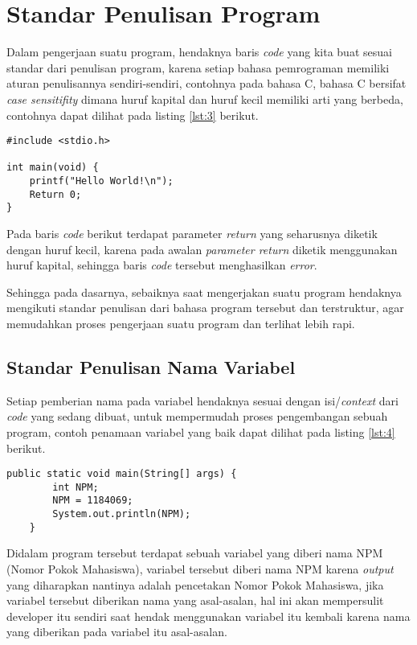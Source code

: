 \chapter{Standar Penulisan Program}

\par 
Dalam pengerjaan suatu program, hendaknya baris \textit{code} yang kita buat sesuai standar dari penulisan program, karena setiap bahasa pemrograman memiliki aturan penulisannya sendiri-sendiri, contohnya pada bahasa C, bahasa C bersifat \textit{case sensitifity} dimana huruf kapital dan huruf kecil memiliki arti yang berbeda, contohnya dapat dilihat pada listing \ref{lst:3} berikut.

\begin{lstlisting}[caption=Contoh commit standar,label={lst:3}]
#include <stdio.h>

int main(void) {
    printf("Hello World!\n");
    Return 0;
}
\end{lstlisting}

\par 
Pada baris \textit{code} berikut terdapat parameter \textit{return} yang seharusnya diketik dengan huruf kecil, karena pada awalan \textit{parameter return} diketik menggunakan huruf kapital, sehingga baris \textit{code} tersebut menghasilkan \textit{error}.
\par 
Sehingga pada dasarnya, sebaiknya saat mengerjakan suatu program hendaknya mengikuti standar penulisan dari bahasa program tersebut dan terstruktur, agar memudahkan proses pengerjaan suatu program dan terlihat lebih rapi.

\section{Standar Penulisan Nama Variabel}
\par 
Setiap pemberian nama pada variabel hendaknya sesuai dengan isi/\textit{context} dari \textit{code} yang sedang dibuat, untuk mempermudah proses pengembangan sebuah program, contoh penamaan variabel yang baik  dapat dilihat pada listing \ref{lst:4} berikut.

\begin{lstlisting}[caption=Contoh commit standar,label={lst:4}]
	public static void main(String[] args) {	
		int NPM;		
		NPM = 1184069;
		System.out.println(NPM);
	}
\end{lstlisting}

\par 
Didalam program tersebut terdapat sebuah variabel yang diberi nama NPM (Nomor Pokok Mahasiswa), variabel tersebut diberi nama NPM karena \textit{output} yang diharapkan nantinya adalah pencetakan Nomor Pokok Mahasiswa, jika variabel tersebut diberikan nama yang asal-asalan, hal ini akan mempersulit developer itu sendiri saat hendak menggunakan variabel itu kembali karena nama yang diberikan pada variabel itu asal-asalan.


